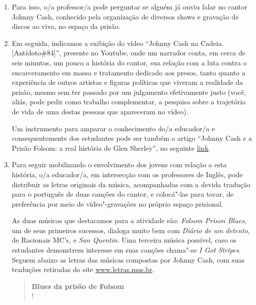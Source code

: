 \documentclass[11pt]{extarticle}
\begin{document}
\begin{enumerate}

\item Para isso,
o/a professor/a pode perguntar se alguém já ouviu falar no cantor Johnny
Cash, conhecido pela organização de diversos shows e gravação de discos
ao vivo, no espaço da prisão. 

\item Em seguida, indicamos a exibição do vídeo
``Johnny Cash na Cadeia. {[}Antídoto\#84{]}'', presente no Youtube, onde
um narrador conta, em cerca de seis minutos, um pouco a história do
cantor, sua relação com a luta contra o encarceramento em massa e
tratamento dedicado aos presos, tanto quanto a experiência de outros
artistas e figuras políticas que viveram a realidade da prisão, mesmo
sem ter passado por um julgamento efetivamente justo (você, aliás, pode
pedir como trabalho complementar, a pesquisa sobre a trajetória de vida
de uma destas pessoas que apareceram no vídeo).

Um instrumento para
amparar o conhecimento do/a educador/a e consequentemente dos estudantes
pode ser também o artigo ``Johnny Cash e a Prisão Folsom: a real
história de Glen Sherley'', no seguinte
\href{https://canalcienciascriminais.jusbrasil.com.br/artigos/409579800/johnny-cash-e-a-prisao-folsom-a-real-historia-de-glen-sherley}{link}.

\item Para seguir mobilizando o envolvimento dos jovens com relação a esta
história, o/a educador/a, em intersecção com os professores de Inglês, pode 
distribuir as letras originais da música,
acompanhadas com a devida tradução para o português de duas canções do
cantor, e colocá"-las para tocar, de preferência por meio de
vídeo"-gravações no próprio espaço prisional. 

As duas músicas que
destacamos para a atividade são: \emph{Folsom Prison Blues}, um de seus
primeiros sucessos, dialoga muito bem com \emph{Diário de um detento}, de
Racionais MC's, e \emph{San Quentin}. Uma terceira música possível, caso
os estudantes demonstrem interesse em suas canções chama"-se \emph{I Got
Stripes}. Seguem abaixo as letras das músicas compostas por Johnny Cash,
com suas traduções retiradas do site
\url{www.letras.mus.br}.


\begin{verse}
\textbf{Blues da prisão de Folsom}\\!


\end{verse}
\end{enumerate}
\end{document}
